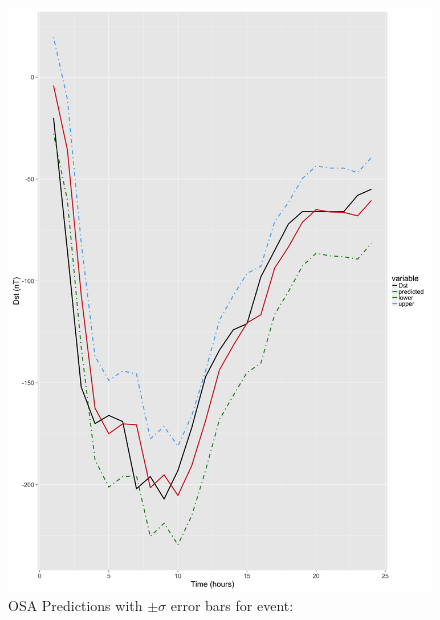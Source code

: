 \documentclass[sw, draft]{AGUTeX}
\begin{document}
\begin{figure}
\noindent\includegraphics[width=\textwidth]{PredictionsModel1/PredErrBars_Storm5.png}
\caption{OSA Predictions with $\pm \sigma$ error bars for event: }
\label{fig:ComparePred1}
\end{figure}
\end{document}
